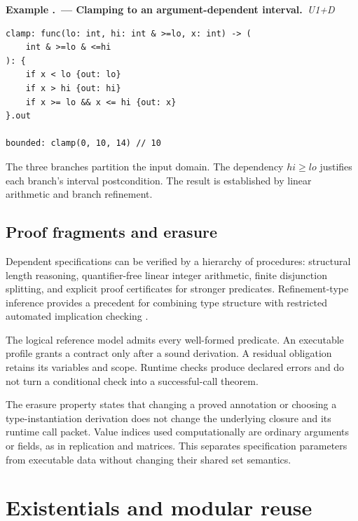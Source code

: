 \documentclass[11pt,a4paper,oneside]{report}
\newcommand{\Uone}{\ensuremath{\profilecal{U}_{1}}}
\newcommand{\Dep}{\ensuremath{\profilecal{D}}}
\def\Uone{U1}%
\def\Dep{D}%
\theoremstyle{remark}
\newcounter{example}[chapter]
\renewcommand{\theexample}{\thechapter.\arabic{example}}
\newcommand{\example}[2]{\refstepcounter{example}\Needspace{5\baselineskip}\par\textbf{Example \theexample\ --- #1.}\ \textit{#2}\par\nopagebreak[4]}
\begin{document}
\example{Clamping to an argument-dependent interval}{\Uone{}+\Dep{}}
\par\noindent\begin{minipage}{\linewidth}
\begin{lstlisting}
clamp: func(lo: int, hi: int & >=lo, x: int) -> (
    int & >=lo & <=hi
): {
    if x < lo {out: lo}
    if x > hi {out: hi}
    if x >= lo && x <= hi {out: x}
}.out

bounded: clamp(0, 10, 14) // 10
\end{lstlisting}
\end{minipage}\par
The three branches partition the input domain. The dependency $hi\ge lo$
justifies each branch's interval postcondition. The result is established by
linear arithmetic and branch refinement.

\section{Proof fragments and erasure}
Dependent specifications can be verified by a hierarchy of procedures:
structural length reasoning, quantifier-free linear integer arithmetic,
finite disjunction splitting, and explicit proof certificates for stronger
predicates. Refinement-type inference provides a precedent for combining type
structure with restricted automated implication checking \cite{liquid}.

The logical reference model admits every well-formed predicate. An executable
profile grants a contract only after a sound derivation. A residual obligation
retains its variables and scope. Runtime checks produce declared errors and do
not turn a conditional check into a successful-call theorem.

The erasure property states that changing a proved annotation or choosing a
type-instantiation derivation does not change the underlying closure and its
runtime call packet. Value indices used computationally are ordinary arguments
or fields, as in replication and matrices. This separates specification
parameters from executable data without changing their shared set semantics.

\chapter{Existentials and modular reuse}
\label{ch:modules}
\end{document}
